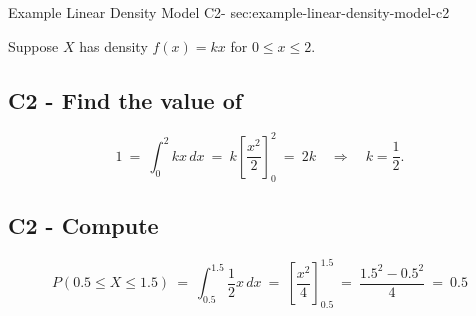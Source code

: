 	\sectionScored
	{Example Linear Density Model}
	{C2-}
	{sec:example-linear-density-model-c2}
	{
	Suppose $X$ has density $f(x)=kx$ for $0\le x\le 2$.
	
	
	\label{subsec:example-linear-density-model-c2-a}
	\subsection*{C2 - Find the value of  }
	
	\[
	1 \> = \> \int_0^2 kx\,dx 
	\> = \> k\left[\frac{x^2}{2}\right]_0^2 
	\> = \> 2k
	\quad\Rightarrow\quad
	k=\frac12.
	\]
	
	
	\vspace{-5mm}
	
	\label{subsec:example-linear-density-model-c2-b}
	\subsection*{C2 - Compute  }
	
	\[
	P(0.5\le X\le 1.5)
	\> = \> \int_{0.5}^{1.5}\frac12 x\,dx
	\> = \> \left[\frac{x^2}{4}\right]_{0.5}^{1.5}
	\> = \> \frac{1.5^2-0.5^2}{4}
	\> = \> 0.5
	\]
	
	\vspace{-5mm}
	}
	
